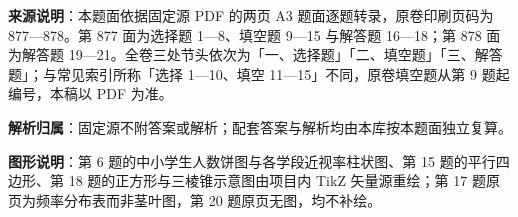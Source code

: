 

\begin{gknotice}
\textbf{来源说明}：本题面依据固定源 PDF 的两页 A3 题面逐题转录，原卷印刷页码为 877—878。第 877 面为选择题 1—8、填空题 9—15 与解答题 16—18；第 878 面为解答题 19—21。全卷三处节头依次为「一、选择题」「二、填空题」「三、解答题」；与常见索引所称「选择 1—10、填空 11—15」不同，原卷填空题从第 9 题起编号，本稿以 PDF 为准。

\textbf{解析归属}：固定源不附答案或解析；配套答案与解析均由本库按本题面独立复算。

\textbf{图形说明}：第 6 题的中小学生人数饼图与各学段近视率柱状图、第 15 题的平行四边形、第 18 题的正方形与三棱锥示意图由项目内 TikZ 矢量源重绘；第 17 题原页为频率分布表而非茎叶图，第 20 题原页无图，均不补绘。
\end{gknotice}


